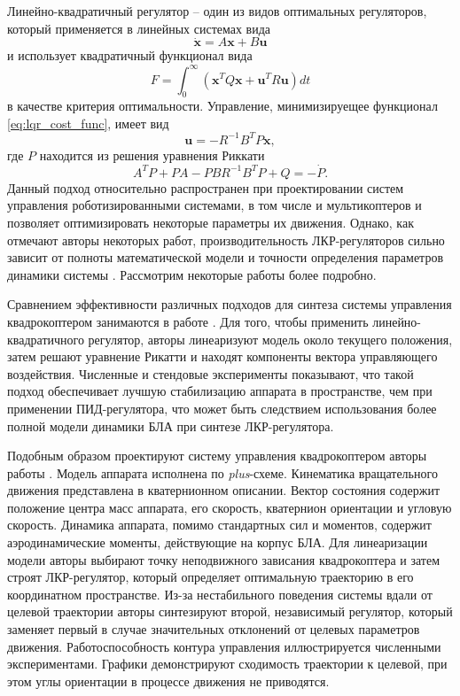 Линейно-квадратичный регулятор -- один из видов оптимальных регуляторов, который применяется в линейных системах вида
\begin{equation} \label{eq:linear_dyn_system}
\dot{\bm{x}} = A\bm{x} + B\bm{u}
\end{equation}
и  использует квадратичный функционал вида
	\begin{equation} \label{eq:lqr_cost_func}
	F = \int_0^{\infty}{(\bm{x}^T Q \bm{x} + \bm{u}^T R \bm{u})} dt
	\end{equation}
в качестве критерия оптимальности. Управление, минимизируещее функционал \eqref{eq:lqr_cost_func}, имеет вид \cite{Letov01}
	\begin{equation} \label{eq:lqr_control_law}
	\bm{u} = -R^{-1} B^T P \bm{x},
	\end{equation}
где $P$ находится из решения уравнения Риккати
	\begin{equation} \label{eq:riqatty}
	A^T P + P A - P B R^{-1} B^T P + Q = -\dot{P}.
	\end{equation}
Данный подход относительно распространен при проектировании систем управления роботизированными системами, в том числе и мультикоптеров \cite{Baklanov01, Muhhamid01, Argentim01} и позволяет оптимизировать некоторые параметры их движения. Однако, как отмечают авторы некоторых работ, производительность ЛКР-регуляторов сильно зависит от полноты математической модели и точности определения параметров динамики системы \cite{Kim01, Joukhadar01}. Рассмотрим некоторые работы более подробно.

Сравнением эффективности различных подходов для синтеза системы управления квадрокоптером занимаются в работе \cite{Bouabdallah01}. Для того, чтобы применить линейно-квадратичного регулятор, авторы линеаризуют модель около текущего положения, затем решают уравнение Рикатти и находят компоненты вектора управляющего воздействия.
Численные и стендовые эксперименты показывают, что такой подход обеспечивает лучшую стабилизацию аппарата в пространстве, чем при применении ПИД-регулятора, что может быть следствием использования более полной модели динамики БЛА при синтезе ЛКР-регулятора.

Подобным образом проектируют систему управления квадрокоптером авторы работы \cite{Reyes-Valeria01}. Модель аппарата исполнена по \textit{plus}-схеме. Кинематика вращательного движения представлена в кватернионном описании. Вектор состояния содержит положение центра масс аппарата, его скорость, кватернион ориентации и угловую скорость. Динамика аппарата, помимо стандартных сил и моментов, содержит аэродинамические моменты, действующие на корпус БЛА. Для линеаризации модели авторы выбирают точку неподвижного зависания квадрокоптера и затем строят ЛКР-регулятор, который определяет оптимальную траекторию в его координатном пространстве. Из-за нестабильного поведения системы вдали от целевой траектории авторы синтезируют второй, независимый регулятор, который заменяет первый в случае значительных отклонений от целевых параметров движения. Работоспособность контура управления иллюстрируется численными экспериментами. Графики демонстрируют сходимость траектории к целевой, при этом углы ориентации в процессе движения не приводятся.

